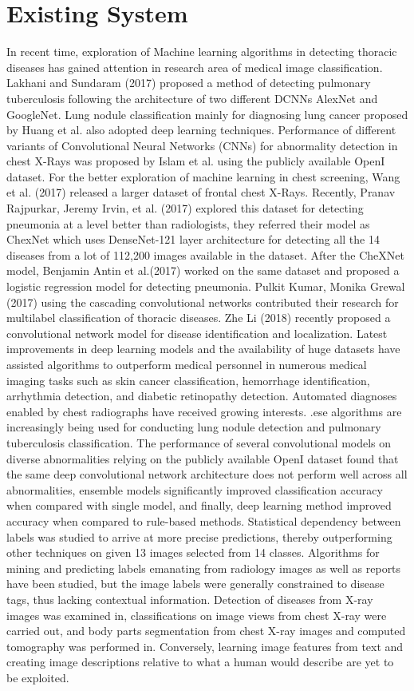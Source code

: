 \documentclass[12pt, a4paper]{report}
\begin{document}
\section{Existing System}
In recent time, exploration of Machine learning algorithms in detecting thoracic diseases has gained attention in research area of medical image classification. Lakhani and Sundaram (2017) proposed a method of detecting pulmonary tuberculosis following the architecture of two different DCNNs AlexNet and GoogleNet. Lung nodule classification mainly for diagnosing lung cancer proposed by Huang et al. also adopted deep learning techniques. Performance of different variants of Convolutional Neural Networks (CNNs) for abnormality detection in chest X-Rays was proposed by Islam et al. using the publicly available OpenI dataset. For the better exploration of machine learning in chest screening, Wang et al. (2017) released a larger dataset of frontal chest X-Rays. Recently, Pranav Rajpurkar, Jeremy Irvin, et al. (2017) explored this dataset for detecting pneumonia at a level better than radiologists, they referred their model as ChexNet which uses DenseNet-121 layer architecture for detecting all the 14 diseases from a lot of 112,200 images available in the dataset. After the CheXNet model, Benjamin Antin et al.(2017) worked on the same dataset and proposed a logistic regression model for detecting pneumonia. Pulkit Kumar, Monika Grewal (2017) using the cascading convolutional networks contributed their research for multilabel classification of thoracic diseases. Zhe Li (2018) recently proposed a convolutional network model for disease identification and localization.
Latest improvements in deep learning models and the availability of huge datasets have assisted algorithms to outperform medical personnel in numerous medical imaging tasks such as skin cancer classification, hemorrhage identification, arrhythmia detection, and diabetic retinopathy detection. Automated diagnoses enabled by chest radiographs have received growing interests. .ese algorithms are increasingly being used for conducting lung nodule detection and pulmonary tuberculosis classification. The performance of several convolutional models on diverse abnormalities relying on the publicly available OpenI dataset found that the same deep convolutional network architecture does not perform well across all abnormalities, ensemble models significantly improved classification accuracy when compared with single model, and finally, deep learning method improved accuracy when compared to rule-based methods. Statistical dependency between labels was studied to arrive at more precise predictions, thereby outperforming other techniques on given 13 images selected from 14 classes. Algorithms for mining and predicting labels emanating from radiology images as well as reports have been studied, but the image labels were generally constrained to disease tags, thus lacking contextual information. Detection of diseases from X-ray images was examined in, classifications on image views from chest X-ray were carried out, and body parts segmentation from chest X-ray images and computed tomography was performed in. Conversely, learning image features from text and creating image descriptions relative to what a human would describe are yet to be exploited.
\end{document}
